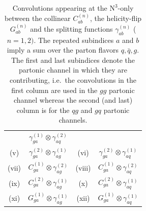 \documentclass[12pt]{article}
\DeclareRobustCommand{\LO}{\text{LO}\xspace}
\DeclareRobustCommand{\N}[1]{\ensuremath{\text{N}^{#1}}} %
\begin{document}
\begin{appendix}
\begin{table}
\begin{tabular}{ |c|c||c|c| }
& $\gamma^{(1)}_{ga}\otimes\gamma^{(2)}_{aq}$  \\

\multirow{1}{*}{(v)} 

& $\gamma^{(2)}_{ga}\otimes\gamma^{(1)}_{ag}$

& \multirow{1}{*}{(vi)} 

& $\gamma^{(2)}_{ga}\otimes\gamma^{(1)}_{aq}$  \\

\multirow{1}{*}{(vii)} 

& $C^{(1)}_{ga}\otimes\gamma^{(2)}_{ag}$

& \multirow{1}{*}{(viii)} 

& $C^{(1)}_{ga}\otimes\gamma^{(2)}_{aq}$  \\

\multirow{1}{*}{(ix)} 

& $C^{(2)}_{ga}\otimes\gamma^{(1)}_{ag}$

& \multirow{1}{*}{(x)} 

& $C^{(2)}_{ga}\otimes\gamma^{(1)}_{aq}$  \\

\multirow{1}{*}{(xi)} 

& $G^{(1)}_{ga}\otimes\gamma^{(1)}_{ag}$

& \multirow{1}{*}{(xii)} 

& $G^{(1)}_{ga}\otimes\gamma^{(1)}_{aq}$  \\

\hline
\end{tabular}
\caption{\label{Table:convosN3LO}
{Convolutions appearing at the \N3\LO-only between the collinear $C^{(n)}_{ab}$, the helicity-flip $G^{(n)}_{ab}$ and the splitting functions $\gamma^{(n)}_{ab}$ ($n=1,2)$. The repeated subindices $a$ and $b$ imply a sum over the parton flavors $q,\bar{q},g$.  The first and last subindices denote the partonic channel in which they are contributing, i.e.\ the convolutions in the first column are used in the $gg$ partonic channel whereas the second (and last) column is for the $qg$ and $gq$ partonic channels.
}}
\renewcommand{\arraystretch}{1}
\end{table}


\end{appendix}
\end{document}
